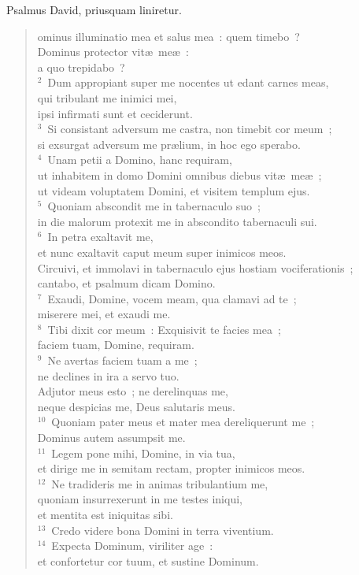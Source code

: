 \bchapter[Psalm]
Psalmus David, priusquam liniretur. \begin{verse}ominus illuminatio mea et salus mea~: quem timebo~?\\ Dominus protector vit\ae\ me\ae~:\\ a quo trepidabo~?\\
${}^{2}$~Dum appropiant super me nocentes ut edant carnes meas,\\ qui tribulant me inimici mei,\\ ipsi infirmati sunt et ceciderunt.\\
${}^{3}$~Si consistant adversum me castra, non timebit cor meum~;\\ si exsurgat adversum me pr\ae lium, in hoc ego sperabo.\\
${}^{4}$~Unam petii a Domino, hanc requiram,\\ ut inhabitem in domo Domini omnibus diebus vit\ae\ me\ae~;\\ ut videam voluptatem Domini, et visitem templum ejus.\\
${}^{5}$~Quoniam abscondit me in tabernaculo suo~;\\ in die malorum protexit me in abscondito tabernaculi sui.\\
${}^{6}$~In petra exaltavit me,\\ et nunc exaltavit caput meum super inimicos meos.\\ Circuivi, et immolavi in tabernaculo ejus hostiam vociferationis~;\\ cantabo, et psalmum dicam Domino.\\
${}^{7}$~Exaudi, Domine, vocem meam, qua clamavi ad te~;\\ miserere mei, et exaudi me.\\
${}^{8}$~Tibi dixit cor meum~: Exquisivit te facies mea~;\\ faciem tuam, Domine, requiram.\\
${}^{9}$~Ne avertas faciem tuam a me~;\\ ne declines in ira a servo tuo.\\ Adjutor meus esto~; ne derelinquas me,\\ neque despicias me, Deus salutaris meus.\\
${}^{10}$~Quoniam pater meus et mater mea dereliquerunt me~;\\ Dominus autem assumpsit me.\\
${}^{11}$~Legem pone mihi, Domine, in via tua,\\ et dirige me in semitam rectam, propter inimicos meos.\\
${}^{12}$~Ne tradideris me in animas tribulantium me,\\ quoniam insurrexerunt in me testes iniqui,\\ et mentita est iniquitas sibi.\\
${}^{13}$~Credo videre bona Domini in terra viventium.\\
${}^{14}$~Expecta Dominum, viriliter age~:\\ et confortetur cor tuum, et sustine Dominum.\end{verse}



